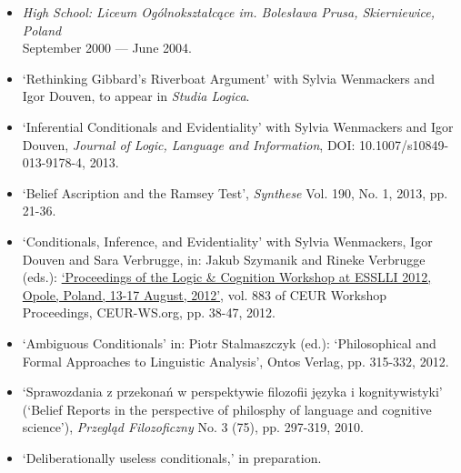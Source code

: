 \documentclass[a4paper,12pt]{article}
\begin{document}
\begin{small}
\begin{itemize}
  \item \emph{High School: Liceum Ogólnokształcące im. Bolesława
      Prusa, Skierniewice, Poland}\\
    September 2000 --- June 2004.

  \end{itemize}


  \begin{itemize}
    \item `Rethinking Gibbard's Riverboat Argument' with Sylvia
    Wenmackers and Igor Douven, to appear in \emph{Studia Logica}.

   \item `Inferential Conditionals and Evidentiality' with Sylvia
    Wenmackers and Igor Douven, \emph{Journal of Logic, Language and Information}, DOI: 10.1007/s10849-013-9178-4, 2013.

  \item `Belief Ascription and the Ramsey Test', \emph{Synthese}
    Vol. 190, No. 1, 2013, pp. 21-36. %

  \item `Conditionals, Inference, and Evidentiality' with Sylvia
    Wenmackers, Igor Douven and Sara Verbrugge, in: Jakub Szymanik and
    Rineke Verbrugge (eds.):
    \href{http://ceur-ws.org/Vol-883/}{`Proceedings of the Logic \&
      Cognition Workshop at ESSLLI 2012, Opole, Poland, 13-17 August,
      2012'}, vol. 883 of CEUR Workshop Proceedings, CEUR-WS.org,
    pp. 38-47, 2012.

  \item `Ambiguous Conditionals' in: Piotr Stalmaszczyk (ed.):
    `Philosophical and Formal Approaches to Linguistic Analysis',
    Ontos Verlag, pp. 315-332, 2012.

  \item `Sprawozdania z przekonań w perspektywie filozofii języka i
    kognitywistyki' (`Belief Reports in the perspective of philosphy
    of language and cognitive science'), \emph{Przegląd Filozoficzny}
    No. 3 (75), pp. 297-319, 2010.

  \end{itemize}

  \begin{itemize}
   \item `Deliberationally useless conditionals,' in preparation.
  \end{itemize}
  


\end{small}
\end{document}
